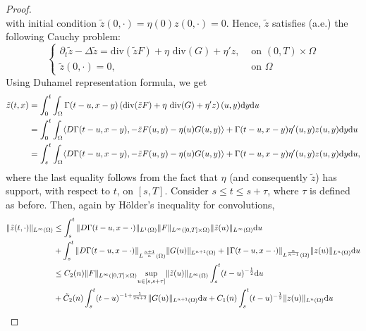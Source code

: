 \documentclass[10pt,a4paper,nouppercase,nowrite]{article}
\numberwithin{equation}{section}
\newcommand{\di}{{\rm d}}
\theoremstyle{definition}
\begin{document}
\begin{proof}
\begin{equation*}
		\end{equation*}
		with initial condition $\tilde{z}(0,\cdot)=\eta(0) z(0,\cdot)=0$.
		Hence, $\tilde{z}$ satisfies (a.e.) the following Cauchy problem:
		\begin{equation*}
			\begin{cases}
				\partial_t \tilde{z} - \Delta \tilde{z} = \text{div}(\tilde{z}F) + \eta \text{ div}(G) + \eta' z,& \text{ on } (0,T) \times \Omega \\
				\tilde{z}(0,\cdot)=0,& \text{ on } \Omega
			\end{cases}
		\end{equation*}
		Using Duhamel representation formula, we get
		\begin{equation*}
			\begin{split}
				\tilde{z}(t,x)&=\int_0^t \int_{\Omega} \Gamma(t-u,x-y) \left( \text{div}(\tilde{z}F)+ \eta \text{ div}(G) + \eta' z \right) (u,y) \di y \di u \\
				&=\int_0^t \int_{\Omega} \langle D\Gamma(t-u,x-y),-\tilde{z}F(u,y) - \eta(u) G(u,y) \rangle + \Gamma(t-u,x-y) \eta' (u,y) z(u,y) \di y \di u \\
				&=\int_s^t \int_{\Omega} \langle D\Gamma(t-u,x-y),-\tilde{z}F(u,y) - \eta(u) G(u,y) \rangle + \Gamma(t-u,x-y) \eta' (u,y) z(u,y) \di y \di u,
			\end{split}
		\end{equation*}
		where the last equality follows from the fact that $\eta$ (and consequently $\tilde{z}$) has support, with respect to $t$, on $[s,T]$. Consider $s \le t \le s+\tau$, where $\tau$ is defined as before. Then, again by Hölder's inequality for convolutions,
		\begin{equation*}
			\begin{split}
			\| \tilde{z}(t,\cdot) \|_{L^{\infty}(\Omega)} &\le \int_s^t \| D\Gamma(t-u,x-\cdot) \|_{L^1(\Omega)} \| F \|_{L^{\infty}([0,T] \times \Omega)} \| \tilde{z}(u) \|_{L^{\infty}(\Omega)} \di u \\
			&+\int_s^t \| D\Gamma(t-u,x-\cdot) \|_{L^{\frac{n+1}{n}}(\Omega)} \| G(u) \|_{L^{n+1}(\Omega)} + \| \Gamma(t-u,x-\cdot) \|_{L^{\frac{n}{n-1}}(\Omega)} \| z(u) \|_{L^{n}(\Omega)} \di u \\
			&\le C_2(n) \| F \|_{L^{\infty}([0,T] \times \Omega)} \underset{u \in [s,s+\tau]}{\sup} \| \tilde{z}(u) \|_{L^{\infty}(\Omega)} \int_s^t (t-u)^{-\frac{1}{2}} \di u \\
			&+ \tilde C_2(n) \int_s^t (t-u)^{-1+\frac{1}{2n+2}} \| G(u) \|_{L^{n+1}(\Omega)} \di u + C_1(n) \int_s^t (t-u)^{-\frac{1}{2}} \| z(u) \|_{L^{n}(\Omega)} \di u \\

\end{split}
\end{equation*}
\end{proof}
\end{document}
